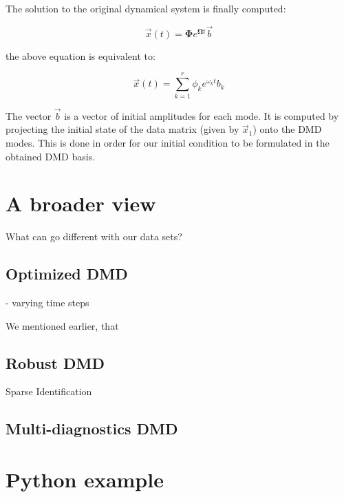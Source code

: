 \documentclass[10pt,twocolumn]{article}
\begin{document}
The solution to the original dynamical system is finally computed:

\begin{equation} \label{eq:x-solution-matrix}
\vec{x}(t) = \bm{\Phi} e^{\bm{\Omega} t} \vec{b}
\end{equation}

the above equation is equivalent to:

\begin{equation} \label{eq:x-solution-summation}
\vec{x}(t)  = \sum_{k=1}^{r} \phi_k e^{\omega_k t} b_k
\end{equation}

The vector $\vec{b}$ is a vector of initial amplitudes for each mode. It is computed by projecting the initial state of the data matrix (given by $\vec{x}_1$) onto the DMD modes. This is done in order for our initial condition to be formulated in the obtained DMD basis.



\section{A broader view} \label{sec:view}

What can go different with our data sets?

\subsection{Optimized DMD}

- varying time steps

We mentioned earlier, that 

\subsection{Robust DMD}



Sparse Identification




\subsection{Multi-diagnostics DMD}

\section{Python example}



\appendix
\end{document}
